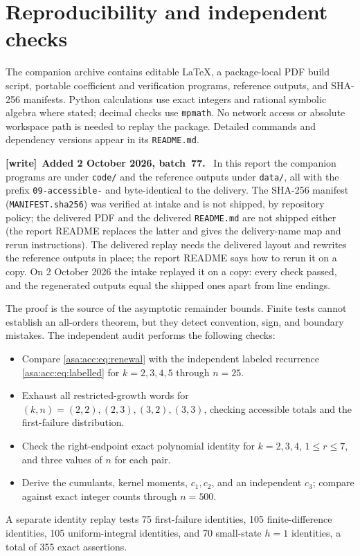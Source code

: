 \documentclass[11pt,letterpaper]{article}
\theoremstyle{remark}\newtheorem{remark}[theorem]{Remark}
\numberwithin{equation}{section}
\newenvironment{writenote}[1][]{\par\smallskip\begingroup\small
 \noindent\textbf{[write]}\if\relax\detokenize{#1}\relax\else~\textbf{#1.}\fi\ }%
 {\par\endgroup\smallskip}
\begin{document}
\section{Reproducibility and independent checks}\label{asa:acc:sec:reproduce}
The companion archive contains editable \LaTeX, a package-local PDF build script, portable coefficient and verification programs, reference outputs, and SHA-256 manifests. Python calculations use exact integers and rational symbolic algebra where stated; decimal checks use \texttt{mpmath}. No network access or absolute workspace path is needed to replay the package. Detailed commands and dependency versions appear in its \texttt{README.md}.
\begin{writenote}[Added 2 October 2026, batch~77]
In this report the companion programs are under \texttt{code/} and the
reference outputs under \texttt{data/}, all with the prefix
\texttt{09-accessible-} and byte-identical to the delivery. The SHA-256
manifest (\texttt{MANIFEST.sha256}) was verified at intake and is not
shipped, by repository policy; the delivered PDF and the delivered
\texttt{README.md} are not shipped either (the report README replaces the
latter and gives the delivery-name map and rerun instructions). The
delivered replay needs the delivered layout and rewrites the reference
outputs in place; the report README says how to rerun it on a copy. On
2 October 2026 the intake replayed it on a copy: every check passed, and
the regenerated outputs equal the shipped ones apart from line endings.
\end{writenote}

The proof is the source of the asymptotic remainder bounds. Finite tests cannot establish an all-orders theorem, but they detect convention, sign, and boundary mistakes. The independent audit performs the following checks:
\begin{itemize}
\item Compare \eqref{asa:acc:eq:renewal} with the independent labeled recurrence \eqref{asa:acc:eq:labelled} for $k=2,3,4,5$ through $n=25$.
\item Exhaust all restricted-growth words for $(k,n)=(2,2),(2,3),(3,2),(3,3)$, checking accessible totals and the first-failure distribution.
\item Check the right-endpoint exact polynomial identity for $k=2,3,4$, $1\le r\le7$, and three values of $n$ for each pair.
\item Derive the cumulants, kernel moments, $c_1,c_2$, and an independent $c_3$; compare against exact integer counts through $n=500$.
\end{itemize}
A separate identity replay tests 75 first-failure identities, 105 finite-difference identities, 105 uniform-integral identities, and 70 small-state $h=1$ identities, a total of 355 exact assertions.
\end{document}

